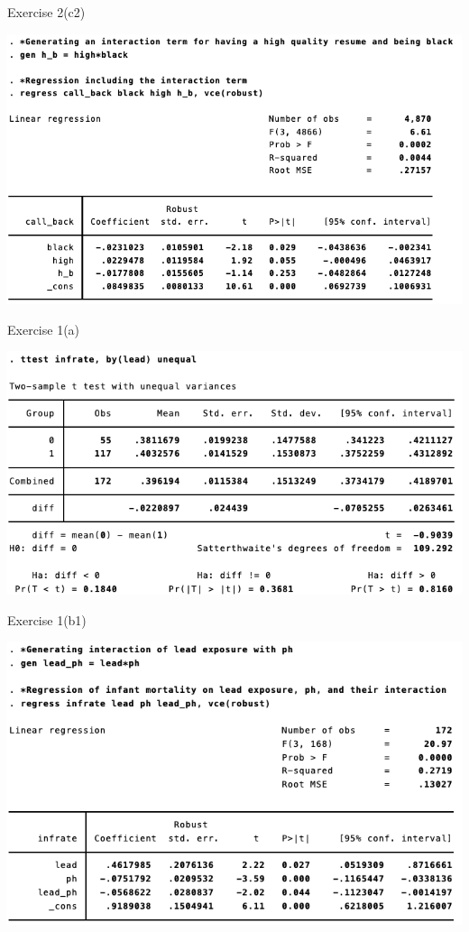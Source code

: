 \documentclass[
  10pt,
  ignorenonframetext,
]{beamer}
\begin{document}
\begin{frame}{Exercise 2(c2)}
\protect\hypertarget{res4-regHighBlack}{}
\begin{center}\includegraphics[width=1\linewidth]{pictures/res4-regHighBlack} \end{center}
\end{frame}

\begin{frame}{Exercise 1(a)}
\protect\hypertarget{ex1-res1-ttestLead}{}
\begin{center}\includegraphics[width=1\linewidth]{pictures/ex1-res1-ttestLead} \end{center}
\end{frame}

\begin{frame}{Exercise 1(b1)}
\protect\hypertarget{ex1-res2-regLeadpH}{}
\begin{center}\includegraphics[width=1\linewidth]{pictures/ex1-res2-regLeadpH} \end{center}
\end{frame}
\end{document}

